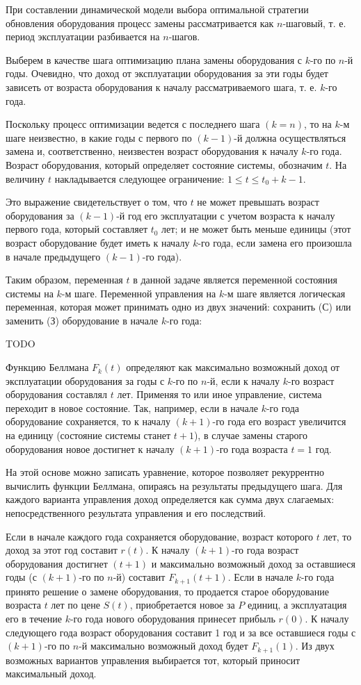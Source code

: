 При составлении динамической модели выбора оптимальной стратегии обновления оборудования процесс замены рассматривается как $n$-шаговый, т. е. период эксплуатации разбивается на $n$-шагов.

Выберем в качестве шага оптимизацию плана замены оборудования с $k$-го по $n$-й годы. Очевидно, что доход от эксплуатации оборудования за эти годы будет зависеть от возраста оборудования к началу рассматриваемого шага, т. е. $k$-го года.

Поскольку процесс оптимизации ведется с последнего шага $(k = n)$, то на $k$-м шаге неизвестно, в какие годы с первого по $(k-1)$-й должна осуществляться замена и, соответственно, неизвестен возраст оборудования к началу $k$-го года. Возраст оборудования, который определяет состояние системы, обозначим $t$. На величину $t$ накладывается следующее ограничение: $1 \leq t \leq t_0 + k - 1$.

Это выражение свидетельствует о том, что $t$ не может превышать возраст оборудования за $(k-1)$-й год его эксплуатации с учетом возраста к началу первого года, который составляет $t_0$ лет; и не может быть меньше единицы (этот возраст оборудование будет иметь к началу $k$-го года, если замена его произошла в начале предыдущего $(k-1)$-го года).

Таким образом, переменная $t$ в данной задаче является переменной состояния системы на $k$-м шаге. Переменной управления на $k$-м шаге является логическая переменная, которая может принимать одно из двух значений: сохранить (С) или заменить (З) оборудование в начале $k$-го года:

TODO

Функцию Беллмана $F_k(t)$ определяют как максимально возможный доход от эксплуатации оборудования за годы с $k$-го по $n$-й, если к началу $k$-го возраст оборудования составлял $t$ лет. Применяя то или иное управление, система переходит в новое состояние. Так, например, если в начале $k$-го года оборудование сохраняется, то к началу $(k + 1)$-го года его возраст увеличится на единицу (состояние системы станет $t+1$), в случае замены старого оборудования новое достигнет к началу $(k + 1)$-го года возраста $t = 1$ год.

На этой основе можно записать уравнение, которое позволяет рекуррентно вычислить функции Беллмана, опираясь на результаты предыдущего шага. Для каждого варианта управления доход определяется как сумма двух слагаемых: непосредственного результата управления и его последствий.

Если в начале каждого года сохраняется оборудование, возраст которого $t$ лет, то доход за этот год составит $r(t)$. К началу $(k+1)$-го года возраст оборудования достигнет $(t+1)$ и максимально возможный доход за оставшиеся годы (с $(k+1)$-го по $n$-й) составит $F_{k+1}(t+1)$. Если в начале $k$-го года принято решение о замене оборудования, то продается старое оборудование возраста $t$ лет по цене $S(t)$, приобретается новое за $P$ единиц, а эксплуатация его в течение $k$-го года нового оборудования принесет прибыль $r(0)$. К началу следующего года возраст оборудования составит 1 год и за все оставшиеся годы с $(k+1)$-го по $n$-й максимально возможный доход будет $F_{k+1}(1)$. Из двух возможных вариантов управления выбирается тот, который приносит максимальный доход.


